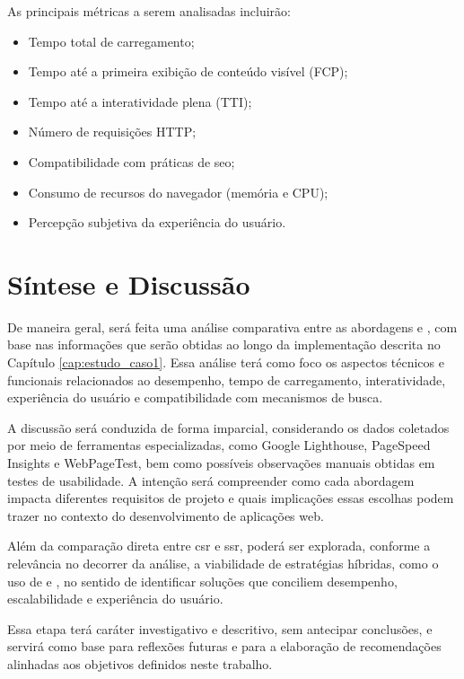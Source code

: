 As principais métricas a serem analisadas incluirão:

\begin{itemize}
\item Tempo total de carregamento;
\item Tempo até a primeira exibição de conteúdo visível (FCP);
\item Tempo até a interatividade plena (TTI);
\item Número de requisições HTTP;
\item Compatibilidade com práticas de \acrshort{seo};
\item Consumo de recursos do navegador (memória e CPU);
\item Percepção subjetiva da experiência do usuário.
\end{itemize}

\section{Síntese e Discussão}
\label{sec:sintese-e-discussao}

De maneira geral, será feita uma análise comparativa entre as abordagens  e , com base nas informações que serão obtidas ao longo da implementação descrita no Capítulo \ref{cap:estudo_caso1}. Essa análise terá como foco os aspectos técnicos e funcionais relacionados ao desempenho, tempo de carregamento, interatividade, experiência do usuário e compatibilidade com mecanismos de busca.

A discussão será conduzida de forma imparcial, considerando os dados coletados por meio de ferramentas especializadas, como Google Lighthouse, PageSpeed Insights e WebPageTest, bem como possíveis observações manuais obtidas em testes de usabilidade. A intenção será compreender como cada abordagem impacta diferentes requisitos de projeto e quais implicações essas escolhas podem trazer no contexto do desenvolvimento de aplicações web.

Além da comparação direta entre {\acrshort{csr}} e {\acrshort{ssr}}, poderá ser explorada, conforme a relevância no decorrer da análise, a viabilidade de estratégias híbridas, como o uso de  e , no sentido de identificar soluções que conciliem desempenho, escalabilidade e experiência do usuário.

Essa etapa terá caráter investigativo e descritivo, sem antecipar conclusões, e servirá como base para reflexões futuras e para a elaboração de recomendações alinhadas aos objetivos definidos neste trabalho.

